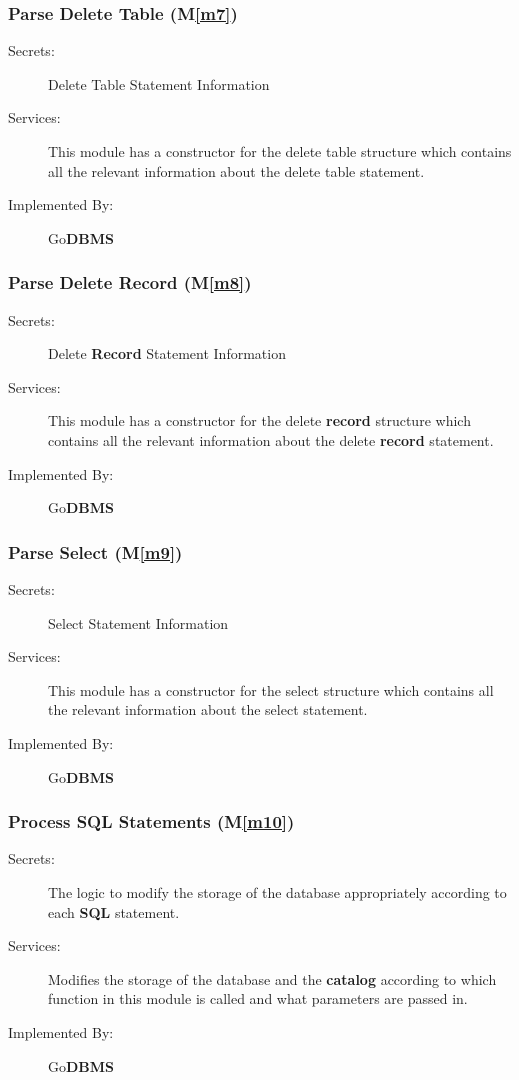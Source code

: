 \documentclass[12pt, titlepage]{article}
\newcommand{\mref}[1]{M\ref{#1}}
\begin{document}
\subsubsection{Parse Delete Table (\mref{m7})}
\begin{description}
\item[Secrets:]Delete Table Statement Information
\item[Services:]This module has a constructor for the delete table structure which contains all the relevant information about the delete table statement.
\item[Implemented By:] Go\textbf{DBMS}
\end{description}

\subsubsection{Parse Delete \textbf{Record} (\mref{m8})}
\begin{description}
\item[Secrets:]Delete \textbf{Record} Statement Information
\item[Services:]This module has a constructor for the delete \textbf{record} structure which contains all the relevant information about the delete \textbf{record} statement.
\item[Implemented By:] Go\textbf{DBMS}
\end{description}

\subsubsection{Parse Select (\mref{m9})}
\begin{description}
\item[Secrets:]Select Statement Information
\item[Services:]This module has a constructor for the select structure which contains all the relevant information about the select statement.
\item[Implemented By:] Go\textbf{DBMS}
\end{description}

\subsubsection{Process \textbf{SQL} Statements (\mref{m10})}
\begin{description}
\item[Secrets:]The logic to modify the storage of the database appropriately according to each \textbf{SQL} statement.
\item[Services:]Modifies the storage of the database and the \textbf{catalog} according to which function in this module is called and what parameters are passed in.
\item[Implemented By:] Go\textbf{DBMS}
\end{description}
\end{document}
